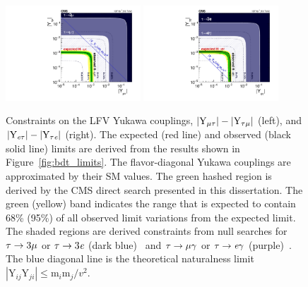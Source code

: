 \begin{figure}[htbp!]
  \centering
  \includegraphics[width=0.45\textwidth]{plots/chapter9/limits/Ymt.pdf}
  \includegraphics[width=0.45\textwidth]{plots/chapter9/limits/Yet.pdf} \\
  \caption{Constraints on the LFV Yukawa couplings, $|\text{Y}_{\mu\tau}|-|\text{Y}_{\tau\mu}|$ (left), and $|\text{Y}_{\textit{e}\tau}|-|\text{Y}_{\tau\textit{e}}|$ (right). The expected (red line) and observed (black solid line) limits are derived from the results shown in Figure~\ref{fig:bdt_limits}. The flavor-diagonal Yukawa couplings are approximated by their SM values. The green hashed region is derived by the CMS direct search presented in this dissertation. The green (yellow) band indicates the range that is expected to contain 68\% (95\%) of all observed limit variations from the expected limit. The shaded regions are derived constraints from null searches for $\tau\to3\mu$ or $\tau\to3\textit{e}$ (dark blue)~\cite{Hayasaka:2010np} and $\tau\to\mu\gamma$ or $\tau\to\textit{e}\gamma$ (purple)~\cite{Harnik:2012pb}. The blue diagonal line is the theoretical naturalness limit $|\text{Y}_{ij}\text{Y}_{ji}|\leq{\text{m}_i}\text{m}_j/v^2$.}
  \label{fig:bdt_yukawa_limits}
\end{figure}






